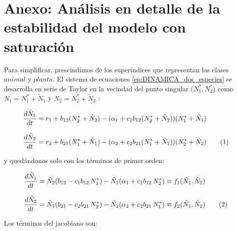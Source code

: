 \section{Anexo: Análisis en detalle de la estabilidad del modelo con saturación}
\label{DINAMICA_ANEXO_estabilidad}

Para simplificar, prescindimos de los superíndices que representan las clases $animal$ y $planta$. 
El sistema de ecuaciones \ref{eq:DINAMICA_dos_especies} se desarrolla en serie de Taylor en la vecindad del punto singular ($N^{*}_{1}, N^{*}_{2}$) como  $N_{1}= N^{*}_1+\tilde{N}_{1}$ y $N_{2}= N^{*}_2+\tilde{N}_{2}$ \cite{murray1993mathematical}:

\begin{equation}
\begin{array}{lcr}
\displaystyle \frac{d\tilde{N}_{1}}{dt} = r_{1}+ b_{12}(N^{*}_2+\tilde{N}_{2})-(\alpha_{1}+ c_{1} b_{12} (N^{*}_2+\tilde{N}_{2}))( N^{*}_1+\tilde{N}_{1})\nonumber\\
\\
\displaystyle \frac{d\tilde{N}_{2}}{dt} = r_{2}+ b_{21}( N^{*}_1+\tilde{N}_{1})-(\alpha_{2}+ c_{2} b_{21}(N^{*}_1+\tilde{N}_{1}))(N^{*}_2+\tilde{N}_{2}) 
\stepcounter{equation}\tag{\theequation}\label{eq:effrateTaylor}
\end{array}
\end{equation}

\noindent y quedándonos solo con los términos de primer orden:

\begin{equation}
\begin{array}{lcr}
\displaystyle \frac{d\tilde{N}_{1}}{dt}= \tilde{N}_{2}( b_{12} - c_{1} b_{12}\, N^{*}_1)-\tilde{N}_{1}(\alpha_{1}+ c_{1} b_{12} \, N^{*}_2) \equiv f_{1}(\tilde{N}_{1},\tilde{N}_{2}) \nonumber\\
\\
\displaystyle \frac{d\tilde{N}_{2}}{dt} = \tilde{N}_{1}( b_{21} - c_{2} b_{21}\, N^{*}_2)-\tilde{N}_{2}(\alpha_{2}+ c_{2} b_{21} \, N^{*}_1) \equiv f_{2}(\tilde{N}_{1},\tilde{N}_{2})
\stepcounter{equation}\tag{\theequation}\label{eq:effrateTaylor2}
\end{array}
\end{equation}

\noindent Los términos del jacobiano son:

